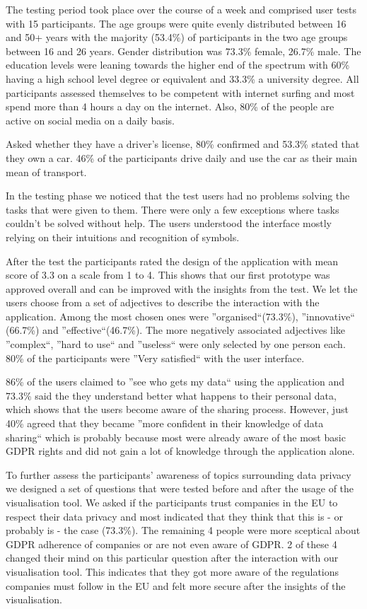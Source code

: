 \documentclass[../paper.tex]{subfiles}
\begin{document}
  The testing period took place over the course of a week and comprised user tests with 15 participants.
  The age groups were quite evenly distributed between 16 and 50+ years with the majority (53.4\%) of participants in the two age groups between 16 and 26 years.
  Gender distribution was 73.3\% female, 26.7\% male. The education levels were leaning towards the higher end of the spectrum with 60\% having a high school level degree or equivalent and 33.3\% a university degree.
  All participants assessed themselves to be competent with internet surfing and most spend more than 4 hours a day on the internet. Also, 80\% of the people are active on social media on a daily basis.
  
  Asked whether they have a driver's license, 80\% confirmed and 53.3\% stated that they own a car. 46\% of the participants drive daily and use the car as their main mean of transport.
  
  In the testing phase we noticed that the test users had no problems solving the tasks that were given to them.
  There were only a few exceptions where tasks couldn't be solved without help. The users understood the interface mostly relying on their intuitions and recognition of symbols.
  
  After the test the participants rated the design of the application with mean score of 3.3 on a scale from 1 to 4. This shows that our first prototype was approved overall and can be improved with the insights from the test. 
  We let the users choose from a set of adjectives to describe the interaction with the application. Among the most chosen ones were ''organised``(73.3\%), ''innovative`` (66.7\%) and ''effective``(46.7\%). The more negatively associated adjectives like ''complex``, ''hard to use`` and ''useless`` were only selected by one person each.
  80\% of the participants were ''Very satisfied`` with the user interface. 
  
  
  86\% of the users claimed to ''see who gets my data`` using the application and 73.3\% said the they understand better what happens to their personal data, which shows that the users become aware of the sharing process.
  However, just 40\% agreed that they became ''more confident in their knowledge of data sharing`` which is probably because most were already aware of the most basic GDPR rights and did not gain a lot of knowledge through the application alone. 
  
  To further assess the participants' awareness of topics surrounding data privacy we designed a set of questions that were tested before and after the usage of the visualisation tool.
  We asked if the participants trust companies in the EU to respect their data privacy and most indicated that they think that this is - or probably is - the case (73.3\%).
  The remaining 4 people were more sceptical about GDPR adherence of companies or are not even aware of GDPR. 2 of these 4 changed their mind on this particular question after the interaction with our visualisation tool. This indicates that they got more aware of the regulations companies must follow in the EU and felt more secure after the insights of the visualisation.
  
\end{document}
